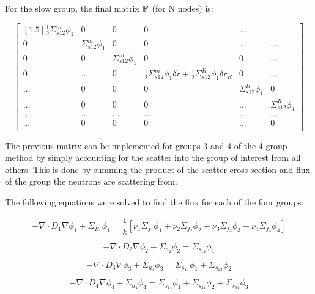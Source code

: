 \documentclass[../main.tex]{subfiles}
\begin{document}
For the slow group, the final matrix $\mathbf{F}$ (for N nodes) is:

\[
	\begin{bmatrix}[1.5]
		\frac{1}{2} \Sigma^m_{s12} \phi_1  & 0 & 0 & 0 & \dots\\
		0 & \Sigma^m_{s12} \phi_1 & 0 & 0 & \dots & \dots \\
		0 & 0 & \Sigma^m_{s12} \phi_1 & 0 & 0 & \dots\\
		0 & \dots & 0 & \frac{1}{2} \Sigma^m_{s12} \phi_1 \delta r + \frac{1}{2} \Sigma^R_{s12} \phi_1 \delta r_R  & 0 & \dots \\
		\dots & 0 & 0 & 0 & \Sigma^R_{s12} \phi_1 & 0 \\
		\dots & 0 & 0 & 0 & \dots & \Sigma^R_{s12} \phi_1 \\
		\dots & \dots & \dots & \dots & \dots & \dots \\
		\dots & 0 & 0 & 0 & \dots & 0 \\
	\end{bmatrix}
	\]

The previous matrix can be implemented for groups 3 and 4 of the 4 group method by simply accounting for the scatter into the group of interest from all others.  This is done by summing the product of the scatter cross section and flux of the group the neutrons are scattering from.

The following equations were solved to find the flux for each of the four groups:

\begin{equation*}
		- \nabla \cdot D_{1} \nabla \phi_{1}+ \Sigma_{R_1} \phi_1 = \frac{1}{k} [\nu_1 \Sigma_{f_1} \phi_{1} + \nu_2 \Sigma_{f_2} \phi_{2} + \nu_3 \Sigma_{f_3} \phi_{3} + \nu_4 \Sigma_{f_4} \phi_{4}] 
	\end{equation*}
	
	\begin{equation*}
		- \nabla \cdot D_{2} \nabla \phi_{2}+ \Sigma_{a_2} \phi_2 = \Sigma_{s_{12}} \phi_1
	\end{equation*}
	
	\begin{equation*}
		- \nabla \cdot D_{3} \nabla \phi_{3}+ \Sigma_{a_3} \phi_3 = \Sigma_{s_{13}} \phi_1 + \Sigma_{s_{23}} \phi_2  
	\end{equation*}
	
	\begin{equation*}
		- \nabla \cdot D_{4} \nabla \phi_{4}+ \Sigma_{a_4} \phi_4 = \Sigma_{s_{14}} \phi_1 + \Sigma_{s_{24}} \phi_2 + \Sigma_{s_{34}} \phi_3
	\end{equation*}
	
\end{document}

